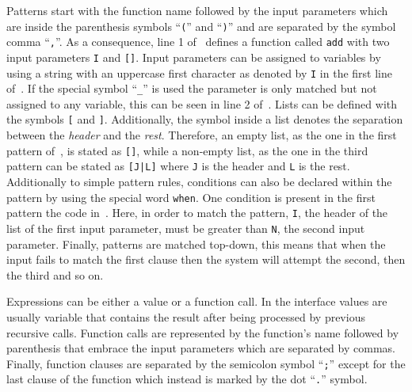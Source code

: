 Patterns start with the function name followed by the input parameters
which are inside the parenthesis symbols ``\texttt{(}'' and
``\texttt{)}'' and are separated by the symbol comma
``\texttt{,}''. As a consequence,
line 1 of~ defines a function called \texttt{add}
with two input parameters \texttt{I} and \texttt{[]}. Input
parameters can be assigned to variables by using a string with an
uppercase first character as denoted by \texttt{I} in the first line
of~. If the special symbol ``\texttt{\_}'' is used the
parameter is only matched but not assigned to any variable, this can
be seen in line 2 of~. Lists can be defined with
the symbols \texttt{[} and \texttt{]}. Additionally, the symbol
\textbar inside a list denotes the separation between the
\emph{header} and the \emph{rest}. Therefore, an empty list, as the
one in the first pattern of~, is stated as
\texttt{[]}, while a non\hyp{}empty list, as the one in the third
pattern can be stated as \texttt{[J|L]} where \texttt{J} is the
header and \texttt{L} is the rest. Additionally to simple pattern
rules, conditions can also be declared within the pattern by using the
special word \texttt{when}. One condition is present in the first
pattern the code in~. Here, in order to match
the pattern, \texttt{I}, the header of the list of the first input
parameter, must be greater than \texttt{N}, the second input
parameter. Finally, patterns are matched top\hyp{}down, this means
that when the input fails to match the first clause then the system
will attempt the second, then the third and so on.

Expressions can be either a value or a function call. In the
interface values are usually variable that contains the result after
being processed by previous recursive calls. Function calls are
represented by the function's name followed by parenthesis that
embrace the input parameters which are separated by commas. Finally,
\erlang function clauses are separated by the semicolon symbol
``\texttt{;}'' except for the last clause of the function which
instead is marked by the dot ``\texttt{.}'' symbol.

